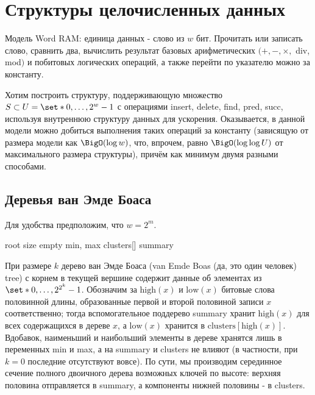 \section{Структуры целочисленных данных}

\begin{definition}
Модель Word RAM: единица данных - слово из $w$ бит. Прочитать или записать слово, сравнить два, вычислить результат базовых арифметических $(+, -, \times,$ div, mod$)$ и побитовых логических операций, а также перейти по указателю можно за константу.
\end{definition}

Хотим построить структуру, поддерживающую множество $S\subset U = \set*{0, \ldots, 2^w - 1}$ с операциями insert, delete, find, pred, succ, используя внутреннюю структуру данных для ускорения. Оказывается, в данной модели можно добиться выполнения таких операций за константу (зависящую от размера модели как $\BigO(\log w)$, что, впрочем, равно $\BigO(\log\log U)$ от максимального размера структуры), причём как минимум двумя разными способами.

\subsection{Деревья ван Эмде Боаса}

Для удобства предположим, что $w = 2^m$.
\begin{algorithmic}[0]
	\algrenewcommand{}
		\State root
	\EndProcedure
		\State size
		\State empty
		\State min, max
		\State clusters[]
		\State summary
	\EndProcedure
\end{algorithmic}

При размере $k$ дерево ван Эмде Боаса (van Emde Boas (да, это один человек) tree) с корнем в текущей вершине содержит данные об элементах из $\set*{0,\ldots,2^{2^k}-1}$. Обозначим за $\text{high}(x)$ и $\text{low}(x)$ битовые слова половинной длины, образованные первой и второй половиной записи $x$ соответственно; тогда вспомогательное поддерево summary хранит $\text{high}(x)$ для всех содержащихся в дереве $x$, а $\text{low}(x)$ хранится в $\text{clusters}[\text{high}(x)]$. Вдобавок, наименьший и наибольший элементы в дереве хранятся лишь в переменных min и max, а на summary и clusters не влияют (в частности, при $k = 0$ последние отсутствуют вовсе). По сути, мы производим серединное сечение полного двоичного дерева возможных ключей по высоте: верхняя половина отправляется в summary, а компоненты нижней половины - в clusters.

